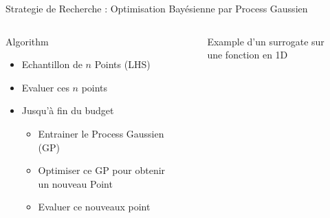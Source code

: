 \begin{frame}{Strategie de Recherche : Optimisation Bayésienne par Process Gaussien }
    \begin{columns}
    \begin{column}[t]{0.4\textwidth} 
        \begin{block}{Algorithm}
                \begin{itemize}
                    \item Echantillon de $n$ Points (LHS)
                    \item Evaluer ces $n$ points
                    \item Jusqu'à fin du budget
                    \begin{itemize}
                        \item Entrainer le Process Gaussien (GP)
                        \item Optimiser ce GP pour obtenir un nouveau Point
                        \item Evaluer ce nouveaux point
                    \end{itemize}
                \end{itemize}
        \end{block}
 
        \end{column}
             
        \begin{column}[t]{0.6\textwidth}
            \begin{figure}
                \centering
                
                \caption{Example d'un surrogate sur une fonction en 1D}
            \end{figure} 
        \end{column}
             
    \end{columns}

\end{frame}

